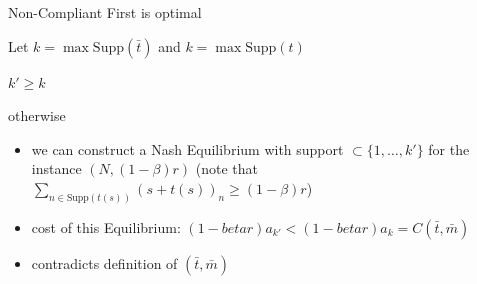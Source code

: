 \documentclass[xcolor=svgnames, english, smaller]{beamer}
\theoremstyle{plain}
\theoremstyle{definition}
\theoremstyle{plain}
\theoremstyle{plain}
\begin{document}
\begin{frame}{Non-Compliant First is optimal}

Let $k = \max \text{Supp}(\bar{t})$ and $k = \max \text{Supp}(t)$
\begin{lemma}
$k' \geq k$
\end{lemma}


otherwise
\begin{itemize}
\item we can construct a Nash Equilibrium with support $\subset \{ 1, \dots, k'\}$ for the instance $(N, (1-\beta)r)$ (note that $\sum_{n\in \text{Supp}(t(s))} (s+t(s))_n \geq (1-\beta)r$)\\
\item \pause cost of this Equilibrium: $(1-beta r)a_{k'} < (1-beta r)a_k = C(\bar{t}, \bar{m})$
\item \pause contradicts definition of $(\bar{t}, \bar{m})$
\end{itemize}

\end{frame}
\end{document}
